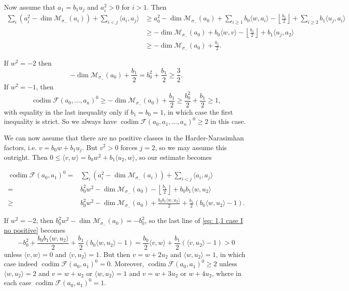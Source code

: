 \documentclass[leqno,11pt]{amsart}
\def\codim{\mathop{\mathrm{codim}}\nolimits}
\def\dim{\mathop{\mathrm{dim}}\nolimits}
\theoremstyle{definition}
\def\FF{\ensuremath{\mathcal F}}
\def\MM{\ensuremath{\mathcal M}}
\begin{document}
Now assume that $a_1=b_1 u_j$ and $a_i^2>0$ for $i>1$.  Then 
\begin{equation}
\begin{split}
 \sum_i (a_i^2-\dim \MM_{\sigma_-}(a_i))+\sum_{i<j}\langle a_i,a_j \rangle
&\geq  a_0^2-\dim\MM_{\sigma_-}(a_0)+\sum_{i \geq 1}b_0 \langle w,a_i \rangle
-\left\lfloor\frac{b_1}{2}\right\rfloor+\sum_{i \geq 2} b_1 \langle u_j,a_i \rangle\\
&\geq -\dim\MM_{\sigma_-}(a_0)+b_0 \langle w,v \rangle
-\left\lfloor\frac{b_1}{2}\right\rfloor+b_1 \langle u_j,a_2 \rangle\\ 
&\geq -\dim\MM_{\sigma_-}(a_0)+\frac{b_1}{2}.
\end{split}
\end{equation}

If $w^2=-2$ then $$-\dim\MM_{\sigma_-}(a_0)+\frac{b_1}{2}=b_0^2+\frac{b_1}{2}\geq\frac{3}{2}.$$  If $w^2=-1$, then $$\codim\FF(a_0,\ldots,a_n)^0\geq-\dim\MM_{\sigma_-}(a_0)+\frac{b_1}{2}\geq \frac{b_0^2}{2}+\frac{b_1}{2}\geq 1,$$ with equality in the last inequality only if $b_1=b_0=1$, in which case the first inequality is strict.  So we always have $\codim\FF(a_0,a_1,...,a_n)^0\geq 2$ in this case.

We can now assume that there are no positive classes in the Harder-Narasimhan factors, i.e. $v=b_0 w+b_1 u_j$.  But $v^2>0$ forces $j=2$, so we may assume this outright.  Then $0 \leq \langle v,w \rangle=b_0 w^2+b_1 \langle u_2,w \rangle$, so our estimate becomes 

 \begin{equation}\label{eq: 1,1 case I no positive}
\begin{split}
\codim\FF(a_0,a_1)^0=&\sum_i (a_i^2-\dim \MM_{\sigma_-}(a_i))+\sum_{i<j}\langle a_i,a_j \rangle\\
= & b_0^2 w^2-\dim\MM_{\sigma_-}(a_0)-\left\lfloor\frac{b_1}{2}\right\rfloor+b_0b_1\langle w,u_2\rangle\\
\geq & b_0^2 w^2-\dim\MM_{\sigma_-}(a_0)+\frac{b_0b_1\langle w,u_2\rangle}{2}+\frac{b_1}{2}\left(b_0\langle w,u_2\rangle-1\right).
\end{split}
\end{equation}

If $w^2=-2$, then $b_0^2w^2-\dim\MM_{\sigma_-}(a_0)=-b_0^2$, so the last line of \eqref{eq: 1,1 case I no positive} becomes $$-b_0^2+\frac{b_0 b_1\langle w,u_2\rangle}{2}+\frac{b_1}{2}(b_0\langle w,u_2\rangle-1)=\frac{b_0}{2}\langle v,w\rangle+\frac{b_1}{2}(\langle v,u_2\rangle-1)>0$$
unless $\langle v,w\rangle=0$ and $\langle v,u_2\rangle=1$.  But then $v=w+2u_2$ and $\langle w,u_2\rangle=1$, in which case indeed $\codim\FF(a_0,a_1)^0=0$.  Moreover, $\codim \FF(a_0,a_1)^0\geq 2$ unless $\langle w,u_2\rangle=2$ and $v=w+u_2$ or $\langle w,u_2\rangle=1$ and $v=w+3u_2$ or $w+4u_2$, where in each case $\codim\FF(a_0,a_1)^0=1$.
\end{document}
